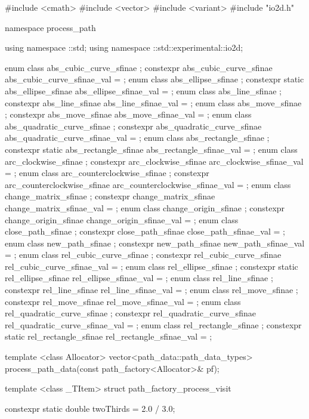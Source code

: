 
\begin{codeblock}
  #include <cmath>
  #include <vector>
  #include <variant>
  #include "io2d.h"
  
  
  namespace process_path {
    using namespace ::std;
    using namespace ::std::experimental::io2d;
  
    enum class abs_cubic_curve_sfinae {};
    constexpr abs_cubic_curve_sfinae abs_cubic_curve_sfinae_val = {};
    enum class abs_ellipse_sfinae {};
    constexpr static abs_ellipse_sfinae abs_ellipse_sfinae_val = {};
    enum class abs_line_sfinae {};
    constexpr abs_line_sfinae abs_line_sfinae_val = {};
    enum class abs_move_sfinae {};
    constexpr abs_move_sfinae abs_move_sfinae_val = {};
    enum class abs_quadratic_curve_sfinae {};
    constexpr abs_quadratic_curve_sfinae abs_quadratic_curve_sfinae_val = {};
    enum class abs_rectangle_sfinae {};
    constexpr static abs_rectangle_sfinae abs_rectangle_sfinae_val = {};
    enum class arc_clockwise_sfinae {};
    constexpr arc_clockwise_sfinae arc_clockwise_sfinae_val = {};
    enum class arc_counterclockwise_sfinae {};
    constexpr arc_counterclockwise_sfinae arc_counterclockwise_sfinae_val = {};
    enum class change_matrix_sfinae {};
    constexpr change_matrix_sfinae change_matrix_sfinae_val = {};
    enum class change_origin_sfinae {};
    constexpr change_origin_sfinae change_origin_sfinae_val = {};
    enum class close_path_sfinae {};
    constexpr close_path_sfinae close_path_sfinae_val = {};
    enum class new_path_sfinae {};
    constexpr new_path_sfinae new_path_sfinae_val = {};
    enum class rel_cubic_curve_sfinae {};
    constexpr rel_cubic_curve_sfinae rel_cubic_curve_sfinae_val = {};
    enum class rel_ellipse_sfinae {};
    constexpr static rel_ellipse_sfinae rel_ellipse_sfinae_val = {};
    enum class rel_line_sfinae {};
    constexpr rel_line_sfinae rel_line_sfinae_val = {};
    enum class rel_move_sfinae {};
    constexpr rel_move_sfinae rel_move_sfinae_val = {};
    enum class rel_quadratic_curve_sfinae {};
    constexpr rel_quadratic_curve_sfinae rel_quadratic_curve_sfinae_val = {};
    enum class rel_rectangle_sfinae {};
    constexpr static rel_rectangle_sfinae rel_rectangle_sfinae_val = {};
  
    template <class Allocator>
    vector<path_data::path_data_types> process_path_data(const path_factory<Allocator>& pf);
  
    template <class _TItem>
    struct path_factory_process_visit {
      constexpr static double twoThirds = 2.0 / 3.0;
  
}}
\end{codeblock}
